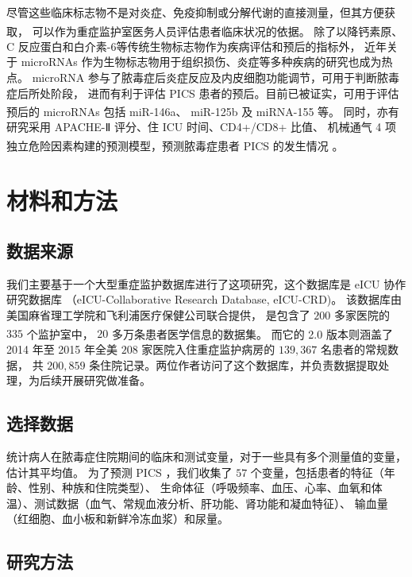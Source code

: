 \documentclass[12pt,titlepage]{article}
\begin{document}
尽管这些临床标志物不是对炎症、免疫抑制或分解代谢的直接测量，但其方便获取，%
可以作为重症监护室医务人员评估患者临床状况的依据\textsuperscript{\cite{pics-conditions}}。%
除了以降钙素原、C 反应蛋白和白介素-6等传统生物标志物作为疾病评估和预后的指标外，%
近年关于 microRNAs 作为生物标志物用于组织损伤、炎症等多种疾病的研究也成为热点。%
microRNA 参与了脓毒症后炎症反应及内皮细胞功能调节，可用于判断脓毒症后所处阶段，%
进而有利于评估 PICS 患者的预后。目前已被证实，可用于评估预后的 microRNAs 包括 miR-146a、%
miR-125b 及 miRNA-155 等\textsuperscript{\cite{micro-rna}}。%
同时，亦有研究采用 APACHE-Ⅱ 评分、住 ICU 时间、CD4+/CD8+ 比值、%
机械通气 4 项独立危险因素构建的预测模型，预测脓毒症患者 PICS 的发生情况%
\textsuperscript{\cite{pics-prediction-methods}}。


\section{材料和方法}

\subsection{数据来源}

我们主要基于一个大型重症监护数据库进行了这项研究，这个数据库是 eICU 协作研究数据库%
（eICU-Collaborative Research Database, eICU-CRD)。%
该数据库由美国麻省理工学院和飞利浦医疗保健公司联合提供，%
是包含了 $200$ 多家医院的 $335$ 个监护室中， $20$ 多万条患者医学信息的数据集\textsuperscript{\cite{eicu}}。%
而它的 2.0 版本则涵盖了 2014 年至 2015 年全美 $208$ 家医院入住重症监护病房的 $139,367$ 名患者的常规数据，%
共 $200,859$ 条住院记录。两位作者访问了这个数据库，并负责数据提取处理，为后续开展研究做准备。

\subsection{选择数据}

统计病人在脓毒症住院期间的临床和测试变量，对于一些具有多个测量值的变量，估计其平均值。%
为了预测 PICS ，我们收集了 $57$ 个变量，包括患者的特征（年龄、性别、种族和住院类型）、%
生命体征（呼吸频率、血压、心率、血氧和体温）、测试数据（血气、常规血液分析、肝功能、肾功能和凝血特征）、%
输血量（红细胞、血小板和新鲜冷冻血浆）和尿量。

\subsection{研究方法}
\end{document}
